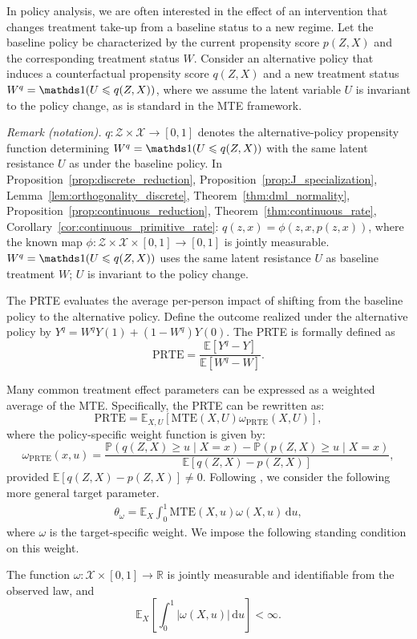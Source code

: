 In policy analysis, we are often interested in the effect of an intervention that changes treatment take-up from a baseline status to a new regime. Let the baseline policy be characterized by the current propensity score $p(Z,X)$ and the corresponding treatment status $W$. Consider an alternative policy that induces a counterfactual propensity score $q(Z,X)$ and a new treatment status $W^q = \indicator(U \leqslant q(Z,X))$, where we assume the latent variable $U$ is invariant to the policy change, as is standard in the MTE framework.

\noindent\textit{Remark (notation).} $q:\mathcal Z\times\mathcal X\to[0,1]$ denotes the alternative-policy propensity function determining $W^q=\indicator(U\leqslant q(Z,X))$ with the same latent resistance $U$ as under the baseline policy. In Proposition~\ref{prop:discrete_reduction}, Proposition~\ref{prop:J_specialization}, Lemma~\ref{lem:orthogonality_discrete}, Theorem~\ref{thm:dml_normality}, Proposition~\ref{prop:continuous_reduction}, Theorem~\ref{thm:continuous_rate}, Corollary~\ref{cor:continuous_primitive_rate}: $q(z,x)=\phi(z,x,p(z,x))$, where the known map $\phi:\mathcal Z\times\mathcal X\times[0,1]\to[0,1]$ is jointly measurable. $W^q=\indicator(U\leqslant q(Z,X))$ uses the same latent resistance $U$ as baseline treatment $W$; $U$ is invariant to the policy change.


The PRTE evaluates the average per-person impact of shifting from the baseline policy to the alternative policy. Define the outcome realized under the alternative policy by $Y^q = W^qY(1) + (1-W^q)Y(0)$. The PRTE is formally defined as
\[ \text{PRTE} = \frac{\mathbb{E}[Y^q - Y]}{\mathbb{E}[W^q - W]}. \]

Many common treatment effect parameters can be expressed as a weighted average of the MTE\@. Specifically, the PRTE can be rewritten as:
\[ \text{PRTE} = \mathbb{E}_{X,U}[\text{MTE}(X, U) \omega_{\text{PRTE}}(X,U)], \]
where the policy-specific weight function is given by:
\[ \omega_{\text{PRTE}}(x,u) = \frac{\mathbb{P}(q(Z,X) \geqslant u \mid X=x) - \mathbb{P}(p(Z,X) \geqslant u \mid X=x)}{\mathbb{E}[q(Z,X) - p(Z,X)]}, \]
provided $\mathbb{E}[q(Z,X) - p(Z,X)] \neq 0$.
Following \citet{heckman2005structural,magne2018using}, we consider the following more general target parameter.
\begin{align}\label{eq:target_mte}
    \theta_\omega = \mathbb{E}_X \int_0^1 \text{MTE}(X,u) \omega(X,u) \, \mathrm{d}u,
\end{align}
where $\omega$ is the target-specific weight. We impose the following standing condition on this weight.
\begin{assumption}\label{asp:target_weight}
The function $\omega:\mathcal X\times[0,1]\to\mathbb R$ is jointly measurable and identifiable from the observed law, and
\[
    \mathbb E_X\!\left[\int_0^1 |\omega(X,u)|\,\mathrm du\right]<\infty.
\]
\end{assumption}

